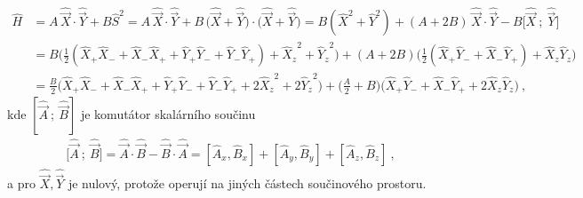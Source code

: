 \documentclass[10pt,a4paper]{article}
\newcommand{\comm}[2]{\left[ #1, #2 \right]}
\begin{document}
\begin{align*}
    \hat H
    &= A \, \hat{\vec X} \!\cdot \hat{\vec Y}
    + B \hat S^2
    =
    A \, \hat{\vec X} \!\cdot \hat{\vec Y}
    + B \, \big(\hat{\vec X} + \hat{\vec Y}\big) \cdot \big(\hat{\vec X} + \hat{\vec Y}\big)
    = B (\hat X^2 + \hat Y^2)
    + (A + 2B) \, \hat{\vec X} \! \cdot \hat{\vec Y}
    - B \big[ \hat{\vec X} \:{;}\: \hat{\vec Y} \big]
    \\[5pt]
    &= B \big(
        \frac{1}{2} (\hat X_+ \hat X_- + \hat X_- \hat X_+ + \hat Y_+ \hat Y_- + \hat Y_- \hat Y_+)
        + {\hat X_z}^2 + {\hat Y_z}^2
    \big)
    + (A + 2B)\big(
        \frac{1}{2} (\hat X_+ \hat Y_- + \hat X_- \hat Y_+) + \hat X_z \hat Y_z
    \big)
    \\[5pt]
    &= \frac{B}{2} \big(
        \hat X_+ \hat X_- + \hat X_- \hat X_+ + \hat Y_+ \hat Y_- + \hat Y_- \hat Y_+
        + 2 {\hat X_z}^2 + 2 {\hat Y_z}^2
    \big)
    + \big( \frac{A}{2} + B \big)\big(
        \hat X_+ \hat Y_- + \hat X_- \hat Y_+
        + 2 \hat X_z \hat Y_z
    \big)
    \: ,
\end{align*}
kde $[ \hat{\vec A} \:{;}\: \hat{\vec B} ]$ je komutátor skalárního součinu
\begin{gather*}
    \big[ \hat{\vec A} \:{;}\: \hat{\vec B} \big]
    = \hat{\vec A} \cdot \hat{\vec B} - \hat{\vec B} \cdot \hat{\vec A}
    = \comm{\hat A_x}{\hat B_x} + \comm{\hat A_y}{\hat B_y} + \comm{\hat A_z}{\hat B_z}
    \: ,
\end{gather*}
a pro $\hat{\vec X}, \hat{\vec Y}$ je nulový, protože operují na jiných částech součinového prostoru.
\end{document}

